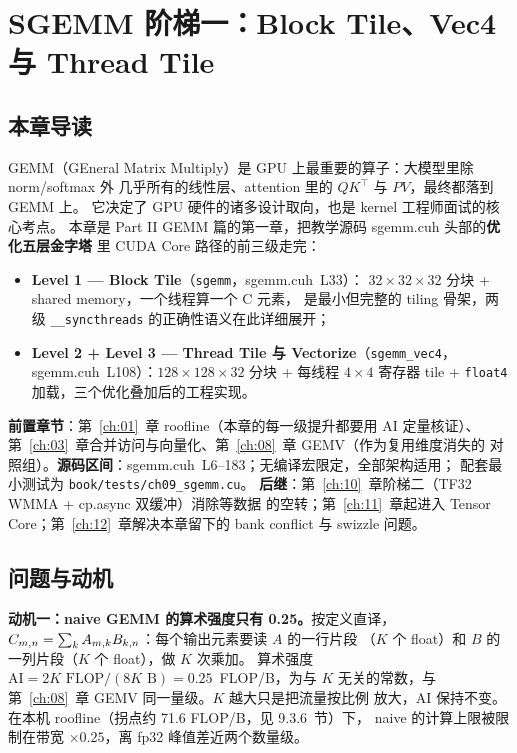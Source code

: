 \chapter{SGEMM 阶梯一：Block Tile、Vec4 与 Thread Tile}\label{ch:09}

\section{本章导读}

GEMM（GEneral Matrix Multiply）是 GPU 上最重要的算子：大模型里除 norm/softmax 外
几乎所有的线性层、attention 里的 $QK^{\top}$ 与 $PV$，最终都落到 GEMM 上。
它决定了 GPU 硬件的诸多设计取向，也是 kernel 工程师面试的核心考点。
本章是 Part II GEMM 篇的第一章，把教学源码 sgemm.cuh 头部的\textbf{优化五层金字塔}
里 CUDA Core 路径的前三级走完：

\begin{itemize}
  \item \textbf{Level 1 — Block Tile}（\texttt{sgemm}，sgemm.cuh~L33）：
        $32 \times 32 \times 32$ 分块 + shared memory，一个线程算一个 C 元素，
        是最小但完整的 tiling 骨架，两级 \texttt{\_\allowbreak{}\_\allowbreak{}syncthreads} 的正确性语义在此详细展开；
  \item \textbf{Level 2 + Level 3 — Thread Tile 与 Vectorize}（\texttt{sgemm\_vec4}，
        sgemm.cuh~L108）：$128 \times 128 \times 32$ 分块 + 每线程 $4 \times 4$
        寄存器 tile + \texttt{float4} 加载，三个优化叠加后的工程实现。
\end{itemize}

\textbf{前置章节}：第~\ref{ch:01}~章 roofline（本章的每一级提升都要用 AI 定量核证）、
第~\ref{ch:03}~章合并访问与向量化、第~\ref{ch:08}~章 GEMV（作为复用维度消失的
对照组）。\textbf{源码区间}：sgemm.cuh~L6--183；无编译宏限定，全部架构适用；
配套最小测试为 \texttt{book/\allowbreak{}tests/\allowbreak{}ch09\_\allowbreak{}sgemm.\allowbreak{}cu}。
\textbf{后继}：第~\ref{ch:10}~章阶梯二（TF32 WMMA + cp.async 双缓冲）消除等数据
的空转；第~\ref{ch:11}~章起进入 Tensor Core；第~\ref{ch:12}~章解决本章留下的
bank conflict 与 swizzle 问题。

\section{问题与动机}

\textbf{动机一：naive GEMM 的算术强度只有 0.25。}按定义直译，
$C\sb{m,n} = \sum\sb{k} A\sb{m,k} B\sb{k,n}$：每个输出元素要读 $A$ 的一行片段
（$K$ 个 float）和 $B$ 的一列片段（$K$ 个 float），做 $K$ 次乘加。
算术强度 $\mathrm{AI} = 2K \text{ FLOP} / (8K \text{ B}) = 0.25$~FLOP/B，为与
$K$ 无关的常数，与第~\ref{ch:08}~章 GEMV 同一量级。$K$ 越大只是把流量按比例
放大，AI 保持不变。在本机 roofline（拐点约 71.6 FLOP/B，见 9.3.6~节）下，
naive 的计算上限被限制在带宽 $\times 0.25$，离 fp32 峰值差近两个数量级。

